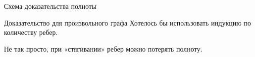 \documentclass{beamer}
\begin{document}
\begin{frame}{Схема доказательства полноты}
\end{frame}


\begin{frame}{Доказательство для произвольного графа}
Хотелось бы использовать индукцию по количеству ребер.

Не так просто, при «стягивании» ребер можно потерять полноту. 
\end{frame}






\end{document}

